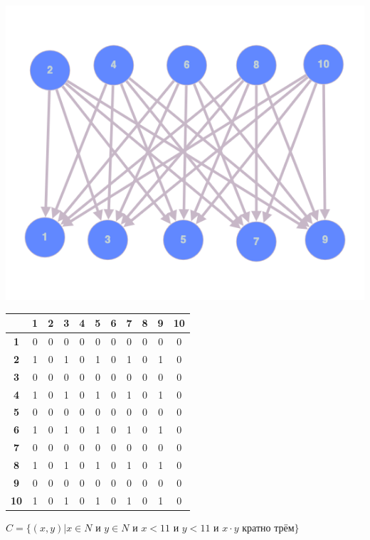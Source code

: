 \documentclass[a4paper,14pt]{extarticle}
\begin{document}
\begin{enumerate}[label=1.\arabic*.]
\begin{center}
    	\includegraphics[width=140mm]{1.1.B}\\
    	\begin{tabular}{|c|c|c|c|c|c|c|c|c|c|c|}
    		\hline
    		&\textbf{1}&\textbf{2}&\textbf{3}&\textbf{4}&\textbf{5}&\textbf{6}&\textbf{7}&\textbf{8}&\textbf{9}&\textbf{10}\\
    		\hline\textbf{1}&0&0&0&0&0&0&0&0&0&0\\
    		\hline\textbf{2}&1&0&1&0&1&0&1&0&1&0\\
    		\hline\textbf{3}&0&0&0&0&0&0&0&0&0&0\\
    		\hline\textbf{4}&1&0&1&0&1&0&1&0&1&0\\
    		\hline\textbf{5}&0&0&0&0&0&0&0&0&0&0\\
    		\hline\textbf{6}&1&0&1&0&1&0&1&0&1&0\\
    		\hline\textbf{7}&0&0&0&0&0&0&0&0&0&0\\
    		\hline\textbf{8}&1&0&1&0&1&0&1&0&1&0\\
    		\hline\textbf{9}&0&0&0&0&0&0&0&0&0&0\\
    		\hline\textbf{10}&1&0&1&0&1&0&1&0&1&0\\
    		\hline
    	\end{tabular}
    \end{center}
    	\bigbreak
    	$C=\{(x, y) | x \in N \textit{ и } y \in N \textit{ и } x < 11 \textit{ и } y < 11 \textit{ и } x\cdot y \text{ кратно трём}  \}$\\
    	\begin{center}
    		\begin{tikzpicture}

\end{tikzpicture}
\end{center}
\end{enumerate}
\end{document}
